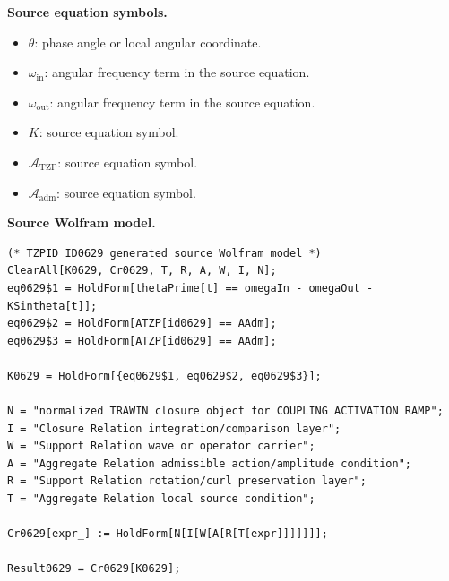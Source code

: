\begin{minipage}[t]{0.49\linewidth}
\begingroup
\small
\raggedright
\textbf{Source equation symbols.}\par
\begin{itemize}[leftmargin=1.35em,itemsep=1pt,topsep=1pt,parsep=0pt]
    \item $\theta$: phase angle or local angular coordinate.
    \item $\omega_{\mathrm{in}}$: angular frequency term in the source equation.
    \item $\omega_{\mathrm{out}}$: angular frequency term in the source equation.
    \item $K$: source equation symbol.
    \item $\mathcal{A}_{\mathrm{TZP}}$: source equation symbol.
    \item $\mathcal{A}_{\mathrm{adm}}$: source equation symbol.
\end{itemize}
\endgroup
\end{minipage}\hfill
\begin{minipage}[t]{0.47\linewidth}
\begingroup
\scriptsize
\raggedright
\textbf{Source Wolfram model.}\par
\begin{Verbatim}[fontsize=\tiny,breaklines=true,breakanywhere=true]
(* TZPID ID0629 generated source Wolfram model *)
ClearAll[K0629, Cr0629, T, R, A, W, I, N];
eq0629$1 = HoldForm[thetaPrime[t] == omegaIn - omegaOut - KSintheta[t]];
eq0629$2 = HoldForm[ATZP[id0629] == AAdm];
eq0629$3 = HoldForm[ATZP[id0629] == AAdm];

K0629 = HoldForm[{eq0629$1, eq0629$2, eq0629$3}];

N = "normalized TRAWIN closure object for COUPLING ACTIVATION RAMP";
I = "Closure Relation integration/comparison layer";
W = "Support Relation wave or operator carrier";
A = "Aggregate Relation admissible action/amplitude condition";
R = "Support Relation rotation/curl preservation layer";
T = "Aggregate Relation local source condition";

Cr0629[expr_] := HoldForm[N[I[W[A[R[T[expr]]]]]]];

Result0629 = Cr0629[K0629];
\end{Verbatim}
\endgroup
\end{minipage}

